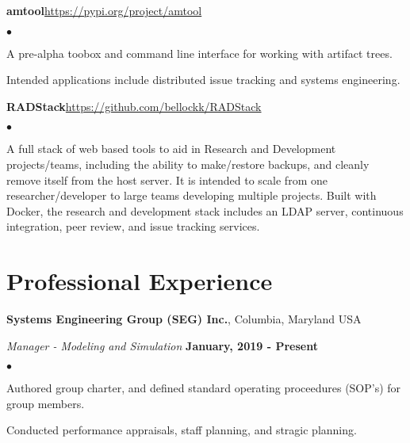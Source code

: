 \documentclass[margin,line]{res}
\newenvironment{list2}{
  \begin{list}{$\bullet$}{%
      \setlength{\itemsep}{0in}
      \setlength{\parsep}{0in} \setlength{\parskip}{0in}
      \setlength{\topsep}{0in} \setlength{\partopsep}{0in} 
      \setlength{\leftmargin}{0.2in}}}{\end{list}}
\begin{document}
\begin{resume}
{\bf amtool}\hfill\url{https://pypi.org/project/amtool}

\begin{list2}
\item A pre-alpha toobox and command line interface for working with artifact trees.
\item Intended applications include distributed issue tracking and systems engineering.
\end{list2}

{\bf RADStack}\hfill\url{https://github.com/bellockk/RADStack}

\begin{list2}
\item A full stack of web based tools to aid in Research and Development projects/teams, including the ability to make/restore backups, and cleanly remove itself from the host server. It is intended to scale from one researcher/developer to large teams developing multiple projects. Built with Docker, the research and development stack includes an LDAP server, continuous integration, peer review, and issue tracking services.
\end{list2}

\section{\sc Professional Experience}
{\bf Systems Engineering Group (SEG) Inc.}, Columbia, Maryland USA

\vspace{-.3cm}
{\em Manager - Modeling and Simulation} \hfill {\bf January, 2019 - Present} \vspace*{.05in}
\begin{list2}
\item Authored group charter, and defined standard operating proceedures (SOP's) for group members.
\item Conducted performance appraisals, staff planning, and stragic planning.
\end{list2}


\end{resume}
\end{document}
